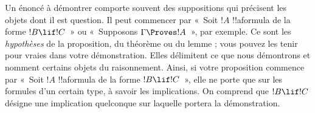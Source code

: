 \documentclass[../../../include/open-logic-section]{subfiles}
\begin{document}
Un énoncé à démontrer comporte
souvent des suppositions qui
précisent les objets dont il
est question. Il peut commencer
par «~Soit $!A$ !!a{formula}
de la forme $!B \lif !C$~»
ou «~Supposons
$\Gamma \Proves !A$~»,
par exemple. Ce sont les
\emph{hypothèses} de la
proposition, du théorème
ou du lemme ; vous pouvez
les tenir pour vraies dans
votre démonstration. Elles
délimitent ce que nous
démontrons et nomment
certains objets du raisonnement.
Ainsi, si votre proposition
commence par «~Soit $!A$
!!a{formula} de la forme
$!B \lif !C$~», elle ne
porte que sur les formules
d'un certain type, à savoir
les implications. On comprend
que $!B \lif !C$ désigne
une implication quelconque
sur laquelle portera la
démonstration.
\end{document}
